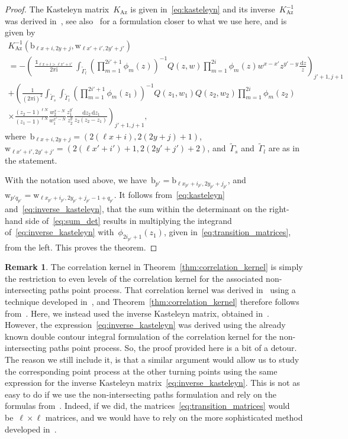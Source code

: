 \documentclass[11pt]{article}
\theoremstyle{plain}
\theoremstyle{definition}
\newtheorem{remark}[theorem]{Remark}
\numberwithin{equation}{section}
\renewcommand{\d}{\,\mathrm{d}}
\renewcommand{\i}{\mathrm{i}}
\DeclareMathOperator{\one}{\mathds{1}}
\begin{document}
\begin{proof}
The Kasteleyn matrix~$K_\text{Az}$ is given in~\eqref{eq:kasteleyn} and its inverse~$K_\text{Az}^{-1}$ was derived in~\cite{Ber21}, see also~\cite{BB23, BNR25}
for a formulation closer to what we use here, and is given by
\begin{multline}\label{eq:inverse_kasteleyn}
K_\text{Az}^{-1}(\mathrm b_{\ell x+i,2y+j},\mathrm w_{\ell x'+i',2y'+j'}) \\
= -\left(\frac{\one_{\ell x+i>\ell x'+i'}}{2\pi\i}\int_{\tilde \Gamma_l}\left(\prod_{m=1}^{2i'+1}\phi_m(z)\right)^{-1}Q(z,w)\prod_{m=1}^{2i}\phi_m(z)w^{x-x'}z^{y'-y}\frac{\d z}{z}\right)_{j'+1,j+1} \\
+\left(\frac{1}{(2\pi\i)^2}\int_{\tilde \Gamma_s}\int_{\tilde \Gamma_l}\left(\prod_{m=1}^{2i'+1}\phi_m(z_1)\right)^{-1}Q(z_1,w_1)Q(z_2,w_2)\prod_{m=1}^{2i}\phi_m(z_2)\right. \\
\left.\times \frac{(z_2-1)^{\ell N}}{(z_1-1)^{\ell N}}\frac{w_2^{x-N}}{w_1^{x'-N}}\frac{z_1^{y'}}{z_2^y}\frac{\d z_2\d z_1}{z_2(z_2-z_1)}\right)_{j'+1,j+1},
\end{multline}
where~$\mathrm b_{\ell x+i,2y+j}=(2(\ell x+i),2(2y+j)+1)$,~$\mathrm w_{\ell x'+i',2y'+j'}=(2(\ell x'+i')+1,2(2y'+j')+2)$, and~$\tilde \Gamma_s$ and~$\tilde \Gamma_l$ are as in the statement. 

With the notation used above, we have~$\mathrm b_{p'}=\mathrm b_{\ell x_{p'}+i_{p'},2y_{p'}+j_{p'}}$, and~$\mathrm w_{p'q_{p'}}=\mathrm w_{\ell x_{p'}+i_{p'},2y_{p'}+j_{p'}-1+q_{p'}}$. It follows from~\eqref{eq:kasteleyn} and~\eqref{eq:inverse_kasteleyn}, that the sum within the determinant on the right-hand side of~\eqref{eq:sum_det} results in multiplying the integrand of~\eqref{eq:inverse_kasteleyn} with~$\phi_{2i_{p'}+1}(z_1)$, given in~\eqref{eq:transition_matrices}, from the left. This proves the theorem.
\end{proof}

\begin{remark}\label{rem:relation_kernal}
The correlation kernel in Theorem~\ref{thm:correlation_kernel} is simply the restriction to even levels of the correlation kernel for the associated non-intersecting paths point process. That correlation kernel was derived in~\cite{Ber21} using a technique developed in~\cite{DK21, BD19}, and Theorem~\ref{thm:correlation_kernel} therefore follows from~\cite{JN06}. Here, we instead used the inverse Kasteleyn matrix, obtained in~\cite{BB23}. However, the expression~\eqref{eq:inverse_kasteleyn} was derived using the already known double contour integral formulation of the correlation kernel for the non-intersecting paths point process. So, the proof provided here is a bit of a detour. The reason we still include it, is that a similar argument would allow us to study the corresponding point process at the other turning points using the same expression for the inverse Kasteleyn matrix~\eqref{eq:inverse_kasteleyn}. This is not as easy to do if we use the non-intersecting paths formulation and rely on the formulas from~\cite{BD19, BB23}. Indeed, if we did, the matrices~\eqref{eq:transition_matrices} would be~$\ell\times \ell$ matrices, and we would have to rely on the more sophisticated method developed in~\cite{BB23}.
\end{remark}
\end{document}
